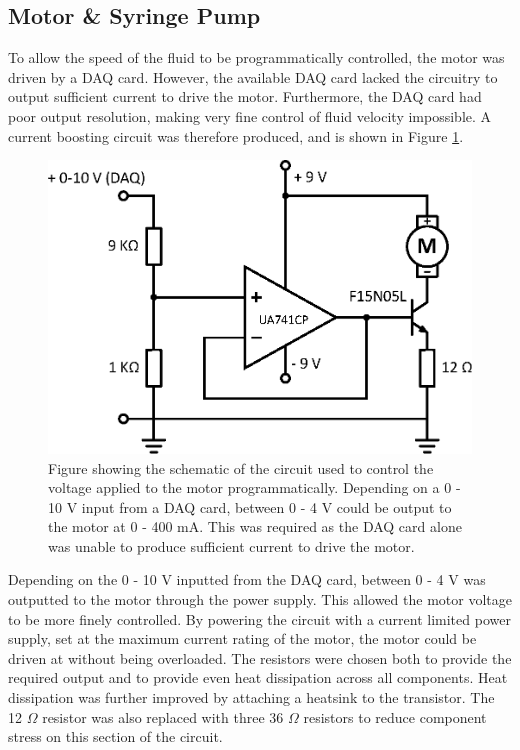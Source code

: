 \documentclass{physics_article_B}
\begin{document}
    \vspace*{-0.1cm}\subsection{Motor \& Syringe Pump\label{sect:method:motor}}

        To allow the speed of the fluid to be programmatically controlled, the motor was driven by a DAQ card. However, the available DAQ card lacked the circuitry to output sufficient current to drive the motor. Furthermore, the DAQ card had poor output resolution, making very fine control of fluid velocity impossible. A current boosting circuit was therefore produced, and is shown in Figure \ref{fig:MotorCircuit}.  
        
            \begin{figure}[H]
                \centering
                \hspace*{-1.3cm}\includegraphics[scale=0.77]{Figures/MotorCircuit.eps}
                \caption{Figure showing the schematic of the circuit used to control the voltage applied to the motor programmatically. Depending on a 0 - 10 V input from a DAQ card, between 0 - 4 V could be output to the motor at 0 - 400 mA. This was required as the DAQ card alone was unable to produce sufficient current to drive the motor.}
                \label{fig:MotorCircuit}
            \end{figure}
        
        Depending on the 0 - 10 V inputted from the DAQ card, between 0 - 4 V was outputted to the motor through the power supply. This allowed the motor voltage to be more finely controlled. By powering the circuit with a current limited power supply, set at the maximum current rating of the motor, the motor could be driven at without being overloaded. The resistors were chosen both to provide the required output and to provide even heat dissipation across all components. Heat dissipation was further improved by attaching a heatsink to the transistor. The 12 $\Omega$ resistor was also replaced with three 36 $\Omega$ resistors\cite{artofelectronics} to reduce component stress on this section of the circuit. 
        
\end{document}
